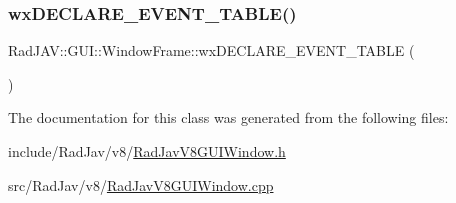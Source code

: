 \subsubsection{\texorpdfstring{wx\+D\+E\+C\+L\+A\+R\+E\+\_\+\+E\+V\+E\+N\+T\+\_\+\+T\+A\+B\+L\+E()}{wxDECLARE\_EVENT\_TABLE()}}
{\footnotesize\ttfamily Rad\+J\+A\+V\+::\+G\+U\+I\+::\+Window\+Frame\+::wx\+D\+E\+C\+L\+A\+R\+E\+\_\+\+E\+V\+E\+N\+T\+\_\+\+T\+A\+B\+LE (\begin{DoxyParamCaption}{ }\end{DoxyParamCaption})\hspace{0.3cm}{\ttfamily [protected]}}



The documentation for this class was generated from the following files\+:\begin{DoxyCompactItemize}
\item 
include/\+Rad\+Jav/v8/\mbox{\hyperlink{_rad_jav_v8_g_u_i_window_8h}{Rad\+Jav\+V8\+G\+U\+I\+Window.\+h}}\item 
src/\+Rad\+Jav/v8/\mbox{\hyperlink{_rad_jav_v8_g_u_i_window_8cpp}{Rad\+Jav\+V8\+G\+U\+I\+Window.\+cpp}}\end{DoxyCompactItemize}
